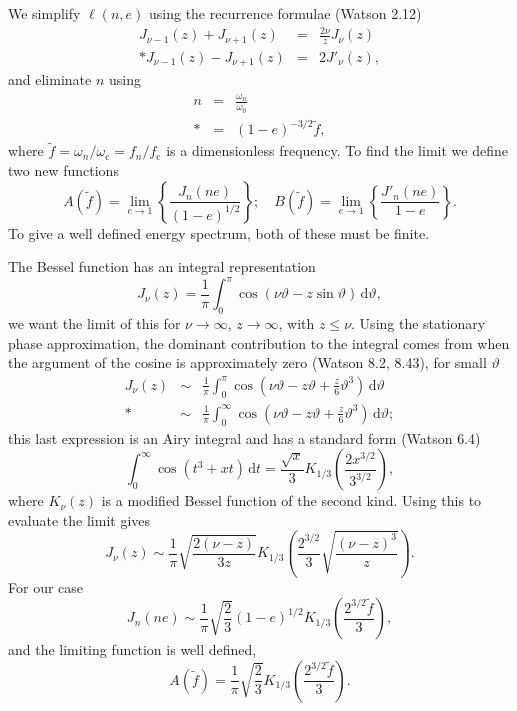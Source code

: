 \documentclass[aps,prd,reprint,showpacs,groupedaddress]{revtex4-1}
\newcommand{\sub}[1]{\ensuremath{_\text{#1}}}
\newcommand{\dd}{\ensuremath{\mathrm{d}}}
\newcommand{\intd}[4]{\ensuremath{\int_{#1}^{#2}{#3}\,\dd{#4}}}
\newcommand{\recip}[1]{\ensuremath{\frac{1}{#1}}}
\begin{document}
We simplify $\ell(n,e)$ using the recurrence formulae (Watson\cite{Watson1995} 2.12)
\begin{eqnarray}
J_{\nu-1}(z) + J_{\nu+1}(z) & = & \frac{2\nu}{z}J_\nu(z)\\*
J_{\nu-1}(z) - J_{\nu+1}(z) & = & 2J'_\nu(z),\label{eq:J_derivative}
\end{eqnarray}
and eliminate $n$ using
\begin{eqnarray}
n & = & \frac{\omega_n}{\omega_0} \nonumber \\*
& = & (1-e)^{-3/2}\tilde{f},
\end{eqnarray}
where $\tilde{f} = \omega_n/\omega\sub{c} = f_n/f\sub{c}$ is a dimensionless frequency. To find the limit we define two new functions
\begin{equation}
A(\tilde{f}) = \lim_{e\rightarrow 1}\left\{\frac{J_n(ne)}{(1-e)^{1/2}}\right\}; \quad B(\tilde{f}) = \lim_{e\rightarrow 1}\left\{\frac{J'_n(ne)}{1-e}\right\}.
\end{equation}
To give a well defined energy spectrum, both of these must be finite.

The Bessel function has an integral representation
\begin{equation}
J_\nu(z) = \recip{\pi}\intd{0}{\pi}{\cos(\nu\vartheta - z\sin\vartheta)}{\vartheta},
\end{equation}
we want the limit of this for $\nu \rightarrow \infty$, $z \rightarrow \infty$, with $z \leq \nu$. Using the stationary phase approximation, the dominant contribution to the integral comes from when the argument of the cosine is approximately zero (Watson\cite{Watson1995} 8.2, 8.43), for small $\vartheta$
\begin{eqnarray}
J_\nu(z) & \sim & \recip{\pi}\intd{0}{\pi}{\cos\left(\nu\vartheta - z\vartheta + \frac{z}{6}\vartheta^3\right)}{\vartheta}\\*
 & \sim & \recip{\pi}\intd{0}{\infty}{\cos\left(\nu\vartheta - z\vartheta + \frac{z}{6}\vartheta^3\right)}{\vartheta};
\end{eqnarray}
this last expression is an Airy integral and has a standard form (Watson\cite{Watson1995} 6.4)
\begin{equation}
\intd{0}{\infty}{\cos(t^3 + xt)}{t} = \frac{\sqrt{x}}{3}K_{1/3}\left(\frac{2x^{3/2}}{3^{3/2}}\right),
\end{equation}
where $K_\nu(z)$ is a modified Bessel function of the second kind. Using this to evaluate the limit gives
\begin{equation}
J_\nu(z) \sim \recip{\pi}\sqrt{\frac{2(\nu - z)}{3z}}K_{1/3}\left(\frac{2^{3/2}}{3}\sqrt{\frac{(\nu -z)^3}{z}}\right).
\label{eq:J_nu}
\end{equation}
For our case
\begin{equation}
J_n(ne) \sim \recip{\pi}\sqrt{\frac{2}{3}}(1-e)^{1/2}K_{1/3}\left(\frac{2^{3/2}\tilde{f}}{3}\right),
\end{equation}
and the limiting function is well defined,
\begin{equation}
A(\tilde{f}) = \recip{\pi}\sqrt{\frac{2}{3}}K_{1/3}\left(\frac{2^{3/2}\tilde{f}}{3}\right).
\end{equation}
\end{document}
